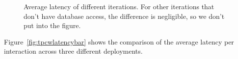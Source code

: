 \begin{figure}[!ht]
\centering
{}
\par\bigskip
\caption{Average latency of different iterations. For other iterations
that don't have database access, the difference is negligible, so we
don't put into the figure.}
\label{fig:rubislatencybar}
\end{figure}

Figure~\ref{fig:tpcwlatencybar} shows the comparison of the average
latency per interaction across three different deployments.

